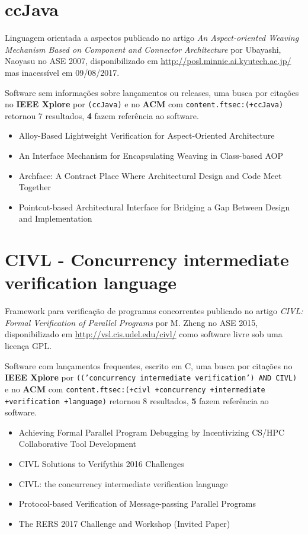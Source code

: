 \section{ccJava}

Linguagem orientada a aspectos
publicado no artigo {\it An Aspect-oriented Weaving Mechanism Based on Component and Connector Architecture}
por Ubayashi, Naoyasu
no ASE 2007,
disponibilizado em \url{http://posl.minnie.ai.kyutech.ac.jp/}
mas inacessível em 09/08/2017.

Software sem informações sobre lançamentos ou releases,
uma busca por citações no {\bf IEEE Xplore} por
\texttt{(ccJava)}
e no {\bf ACM} com
\texttt{content.ftsec:(+ccJava)}
retornou
7 resultados,
{\bf 4} fazem referência ao software.

\begin{itemize}
\item Alloy-Based Lightweight Verification for Aspect-Oriented Architecture
\item An Interface Mechanism for Encapsulating Weaving in Class-based AOP
\item Archface: A Contract Place Where Architectural Design and Code Meet Together
\item Pointcut-based Architectural Interface for Bridging a Gap Between Design and Implementation
\end{itemize}


\section{CIVL - Concurrency intermediate verification language}

Framework para verificação de programas concorrentes
publicado no artigo {\it CIVL: Formal Verification of Parallel Programs}
por M. Zheng
no ASE 2015,
disponibilizado em \url{http://vsl.cis.udel.edu/civl/}
como software livre
sob uma licença GPL.

Software com lançamentos frequentes,
escrito em C,
uma busca por citações no {\bf IEEE Xplore} por
\texttt{(('concurrency intermediate verification') AND CIVL)}
e no {\bf ACM} com
\texttt{content.ftsec:(+civl +concurrency +intermediate +verification +language)}
retornou
8 resultados,
{\bf 5} fazem referência ao software.

\begin{itemize}
\item Achieving Formal Parallel Program Debugging by Incentivizing CS/HPC Collaborative Tool Development
\item CIVL Solutions to Verifythis 2016 Challenges
\item CIVL: the concurrency intermediate verification language
\item Protocol-based Verification of Message-passing Parallel Programs
\item The RERS 2017 Challenge and Workshop (Invited Paper)
\end{itemize}


